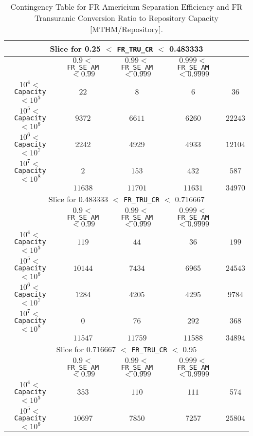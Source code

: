 \begin{center}
\begin{table}[htbp]
\caption{Contingency Table for FR Americium Separation Efficiency and FR Transuranic Conversion Ratio to Repository Capacity [MTHM/Repository].}
\label{FR_SE_AM_and_FR_TRU_CR_to_Capacity_with_IJK433}
\footnotesize
\begin{center}
\begin{tabular}{|c||c|c|c||c|}
\hline
\multicolumn{5}{|c|}{Slice for 0.25 $<$ \texttt{FR\_TRU\_CR} $<$ 0.483333}\\
\hline
&$0.9 <$ \texttt{FR\_SE\_AM} $< 0.99$&$0.99 <$ \texttt{FR\_SE\_AM} $< 0.999$&$0.999 <$ \texttt{FR\_SE\_AM} $< 0.9999$&\\
\hline
$10^4 <$ \texttt{Capacity} $< 10^5$&$22$&$8$&$6$&$36$\\
\hline
$10^5 <$ \texttt{Capacity} $< 10^6$&$9372$&$6611$&$6260$&$22243$\\
\hline
$10^6 <$ \texttt{Capacity} $< 10^7$&$2242$&$4929$&$4933$&$12104$\\
\hline
$10^7 <$ \texttt{Capacity} $< 10^8$&$2$&$153$&$432$&$587$\\
\hline
&$11638$&$11701$&$11631$&$34970$\\
\hline
\hline
\multicolumn{5}{|c|}{Slice for 0.483333 $<$ \texttt{FR\_TRU\_CR} $<$ 0.716667}\\
\hline
&$0.9 <$ \texttt{FR\_SE\_AM} $< 0.99$&$0.99 <$ \texttt{FR\_SE\_AM} $< 0.999$&$0.999 <$ \texttt{FR\_SE\_AM} $< 0.9999$&\\
\hline
$10^4 <$ \texttt{Capacity} $< 10^5$&$119$&$44$&$36$&$199$\\
\hline
$10^5 <$ \texttt{Capacity} $< 10^6$&$10144$&$7434$&$6965$&$24543$\\
\hline
$10^6 <$ \texttt{Capacity} $< 10^7$&$1284$&$4205$&$4295$&$9784$\\
\hline
$10^7 <$ \texttt{Capacity} $< 10^8$&$0$&$76$&$292$&$368$\\
\hline
&$11547$&$11759$&$11588$&$34894$\\
\hline
\hline
\multicolumn{5}{|c|}{Slice for 0.716667 $<$ \texttt{FR\_TRU\_CR} $<$ 0.95}\\
\hline
&$0.9 <$ \texttt{FR\_SE\_AM} $< 0.99$&$0.99 <$ \texttt{FR\_SE\_AM} $< 0.999$&$0.999 <$ \texttt{FR\_SE\_AM} $< 0.9999$&\\
\hline
$10^4 <$ \texttt{Capacity} $< 10^5$&$353$&$110$&$111$&$574$\\
\hline
$10^5 <$ \texttt{Capacity} $< 10^6$&$10697$&$7850$&$7257$&$25804$\\

\end{tabular}
\end{center}
\end{table}
\end{center}
